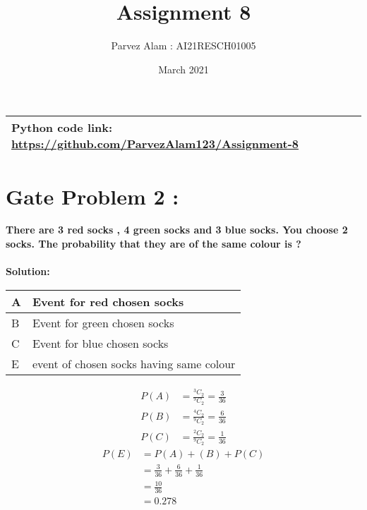 \documentclass{article}
\title{Assignment 8}
\author{Parvez Alam : AI21RESCH01005 }
\date{March 2021}
\begin{document}
\maketitle
\begin{multicols}{2}
\begin{center}
    \begin{tabular}{|p{5cm}|}
    \hline
        Python code link: \url{https://github.com/ParvezAlam123/Assignment-8} \\
    \hline
    \end{tabular}
\end{center}
\section{Gate Problem 2 :}
\textbf{There are 3 red socks , 4 green socks and 3 blue socks. You choose 2 socks. The probability that they are of the same colour is ?} \\ \\
\textbf{Solution:}
\begin{center}
    \begin{tabular}{|p{1cm}|p{4cm}|}
    \hline
       A & Event for red chosen socks \\
       \hline
        B & Event for green chosen socks \\
        \hline
        C & Event for blue chosen socks \\
        \hline
        E & event of chosen socks having same colour \\
        \hline
    \end{tabular}
\end{center}
\begin{align}
P(A)&=\frac{{}^{3}C_{2}}{{}^{9}C_{2}}=\frac{3}{36} \nonumber \\
P(B)&=\frac{{}^{4}C_{2}}{{}^{9}C_{2}}=\frac{6}{36} \nonumber \\
P(C)&=\frac{{}^{2}C_{2}}{{}^{9}C_{2}}=\frac{1}{36} \nonumber
\end{align}
\begin{align}
    P(E) &=P(A)+(B)+P(C) \nonumber \\
         &=\frac{3}{36}+\frac{6}{36}+\frac{1}{36} \nonumber \\
         &=\frac{10}{36} \nonumber \\
         &=0.278 \nonumber 
\end{align}




\end{multicols}
\end{document}
